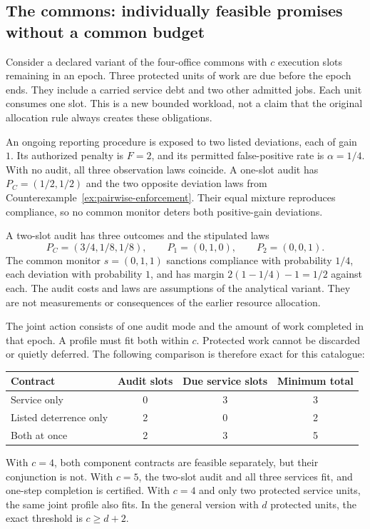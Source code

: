 \documentclass[11pt,letterpaper]{article}
\theoremstyle{plain}
\theoremstyle{definition}
\theoremstyle{remark}
\begin{document}
\subsection{The commons: individually feasible promises without a common budget}
Consider a declared variant of the four-office commons with $c$ execution slots remaining in an epoch. Three protected units of work are due before the epoch ends. They include a carried service debt and two other admitted jobs. Each unit consumes one slot. This is a new bounded workload, not a claim that the original allocation rule always creates these obligations.

An ongoing reporting procedure is exposed to two listed deviations, each of gain $1$. Its authorized penalty is $F=2$, and its permitted false-positive rate is $\alpha=1/4$. With no audit, all three observation laws coincide. A one-slot audit has $P_C=(1/2,1/2)$ and the two opposite deviation laws from Counterexample~\ref{ex:pairwise-enforcement}. Their equal mixture reproduces compliance, so no common monitor deters both positive-gain deviations.

A two-slot audit has three outcomes and the stipulated laws
\[
P_C=(3/4,1/8,1/8),\qquad
P_1=(0,1,0),\qquad P_2=(0,0,1).
\]
The common monitor $s=(0,1,1)$ sanctions compliance with probability $1/4$, each deviation with probability $1$, and has margin $2(1-1/4)-1=1/2$ against each. The audit costs and laws are assumptions of the analytical variant. They are not measurements or consequences of the earlier resource allocation.

The joint action consists of one audit mode and the amount of work completed in that epoch. A profile must fit both within $c$. Protected work cannot be discarded or quietly deferred. The following comparison is therefore exact for this catalogue:
\begin{center}
\begin{tabular}{@{}lccc@{}}
\toprule
Contract & Audit slots & Due service slots & Minimum total\\
\midrule
Service only & 0 & 3 & 3\\
Listed deterrence only & 2 & 0 & 2\\
Both at once & 2 & 3 & 5\\
\bottomrule
\end{tabular}
\end{center}
With $c=4$, both component contracts are feasible separately, but their conjunction is not. With $c=5$, the two-slot audit and all three services fit, and one-step completion is certified. With $c=4$ and only two protected service units, the same joint profile also fits. In the general version with $d$ protected units, the exact threshold is $c\geq d+2$.
\end{document}
